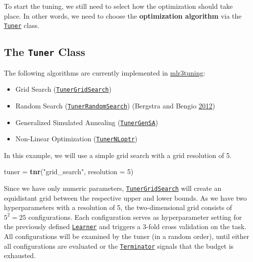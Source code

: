 \documentclass[]{scrbook}
\newenvironment{Shaded}{\begin{snugshade}}{\end{snugshade}}
\newcommand{\DataTypeTok}[1]{\textcolor[rgb]{0.13,0.29,0.53}{#1}}
\newcommand{\DecValTok}[1]{\textcolor[rgb]{0.00,0.00,0.81}{#1}}
\newcommand{\KeywordTok}[1]{\textcolor[rgb]{0.13,0.29,0.53}{\textbf{#1}}}
\newcommand{\NormalTok}[1]{#1}
\newcommand{\StringTok}[1]{\textcolor[rgb]{0.31,0.60,0.02}{#1}}
\providecommand{\tightlist}{%
  \setlength{\itemsep}{0pt}\setlength{\parskip}{0pt}}
\renewenvironment{Shaded} {\begin{snugshade}\small} {\end{snugshade}}
\begin{document}
To start the tuning, we still need to select how the optimization should take place.
In other words, we need to choose the \textbf{optimization algorithm} via the \href{https://mlr3tuning.mlr-org.com/reference/Tuner.html}{\texttt{Tuner}} class.

\hypertarget{the-tuner-class}{%
\subsection{\texorpdfstring{The \texttt{Tuner} Class}{The Tuner Class}}\label{the-tuner-class}}

The following algorithms are currently implemented in \href{https://mlr3tuning.mlr-org.com}{mlr3tuning}:

\begin{itemize}
\tightlist
\item
  Grid Search (\href{https://mlr3tuning.mlr-org.com/reference/mlr_tuners_grid_search.html}{\texttt{TunerGridSearch}})
\item
  Random Search (\href{https://mlr3tuning.mlr-org.com/reference/mlr_tuners_random_search.html}{\texttt{TunerRandomSearch}}) (Bergstra and Bengio \protect\hyperlink{ref-bergstra2012}{2012})
\item
  Generalized Simulated Annealing (\href{https://mlr3tuning.mlr-org.com/reference/mlr_tuners_gensa.html}{\texttt{TunerGenSA}})
\item
  Non-Linear Optimization (\href{https://mlr3tuning.mlr-org.com/reference/mlr_tuners_nloptr.html}{\texttt{TunerNLoptr}})
\end{itemize}

In this example, we will use a simple grid search with a grid resolution of 5.

\begin{Shaded}
\begin{Highlighting}[]
\NormalTok{tuner =}\StringTok{ }\KeywordTok{tnr}\NormalTok{(}\StringTok{"grid_search"}\NormalTok{, }\DataTypeTok{resolution =} \DecValTok{5}\NormalTok{)}
\end{Highlighting}
\end{Shaded}

Since we have only numeric parameters, \href{https://mlr3tuning.mlr-org.com/reference/mlr_tuners_grid_search.html}{\texttt{TunerGridSearch}} will create an equidistant grid between the respective upper and lower bounds.
As we have two hyperparameters with a resolution of 5, the two-dimensional grid consists of \(5^2 = 25\) configurations.
Each configuration serves as hyperparameter setting for the previously defined \href{https://mlr3.mlr-org.com/reference/Learner.html}{\texttt{Learner}} and triggers a 3-fold cross validation on the task.
All configurations will be examined by the tuner (in a random order), until either all configurations are evaluated or the \href{https://bbotk.mlr-org.com/reference/Terminator.html}{\texttt{Terminator}} signals that the budget is exhausted.
\end{document}
